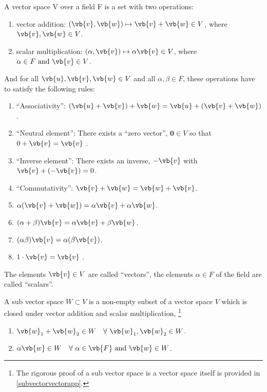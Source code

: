 \documentclass[a4paper,12pt]{report}
\begin{document}
\begin{definition}
A vector space V over a field F is a set with two operations:

\begin{enumerate}
    \item vector addition: \((\vb{v}, \vb{w}) \mapsto \vb{v} + \vb{w} \in V \), where \(\vb{v} , \vb{w} \in V\).
    \item scalar multiplication: \((\alpha ,\vb{v}) \mapsto \alpha \vb{v} \in V\), where \(\alpha \in F \text { and } \vb{v} \in V\). 
\end{enumerate}

And for all \(\vb{u} ,\vb{v} ,\vb{w} \in V\) and all \(\alpha ,\beta \in F\), these operations have to satisfy the following rules:

\begin{enumerate}[label=(A\arabic*)]\label{vectorspace} 
    \item ``Associativity'': \((\vb{u} + \vb{v} ) + \vb{w}  = \vb{u}  + (\vb{v} + \vb{w} )\) .
    \item ``Neutral element'': There exists a ``zero vector'', \(\boldsymbol{0} \in V\) so that \(0 + \vb{v} = \vb{v} \)  .
    \item ``Inverse element'': There exists an inverse, \(-\vb{v} \) with \(\vb{v} + (-\vb{v} ) = 0\).
    \item ``Commutativity'': \(\vb{v} + \vb{w} = \vb{w} + \vb{v} \).
    \item \(\alpha (\vb{v} +\vb{w} ) = \alpha \vb{v} + \alpha \vb{w} \).
    \item \((\alpha +\beta )\vb{v} = \alpha \vb{v} + \beta \vb{w} \).
    \item \((\alpha \beta )\vb{v} = \alpha (\beta \vb{v} )\).
    \item \(1\cdot \vb{v} = \vb{v} \)      .
\end{enumerate}

The elements \(\vb{v} \in V\) are called ``vectors'', the elements \(\alpha \in F\) of the field are called ``scalars''.  
\end{definition}

\begin{definition} \label{subvectorspace} 
A sub vector space \(W \subset V \) is a non-empty subset of a vector space \(V\) which is closed under vector addition and scalar multiplication, \ie\footnote{The rigorous proof of a sub vector space is a vector space itself is provided in \cref{subvectorvectorapp}.} 

\begin{enumerate}[label=(B\arabic*)]
    \item \(\vb{w} _{1} + \vb{w} _{2} \in W ~~~ \forall ~ \vb{w} _{1} , \vb{w} _{2} \in W\).
    \item \(\alpha \vb{w} \in W ~~~ \forall ~ \alpha \in \vb{F} \text { and } \vb{w} \in W\).     
\end{enumerate}
\end{definition}
\end{document}
